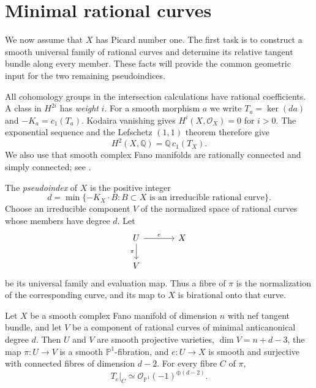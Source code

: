 \section{Minimal rational curves}\label{sec:minimal-curves}

We now assume that $X$ has Picard number one.  The first task is to
construct a smooth universal family of rational curves and determine its
relative tangent bundle along every member.  These facts will provide the
common geometric input for the two remaining pseudoindices.

All cohomology groups in the intersection calculations have rational
coefficients.  A class in $H^{2i}$ has \emph{weight} $i$.  For a smooth
morphism $a$ we write $T_a=\ker(da)$ and $-K_a=c_1(T_a)$.
Kodaira vanishing gives $H^i(X,\mathcal O_X)=0$ for $i>0$.
The exponential sequence and the Lefschetz $(1,1)$ theorem therefore give
\begin{equation}\label{eq:picard-cohomology}
  H^2(X,\mathbb Q)=\mathbb Q\,c_1(T_X).
\end{equation}
We also use that smooth complex Fano manifolds are rationally connected
and simply connected; see
\cite[Theorems~2.11 and~5.3.2]{CampanaPeternell1999}.

The \emph{pseudoindex} of $X$ is the positive integer
\[
 d=\min\{-K_X\cdot B:B\subset X\text{ is an irreducible rational curve}\}.
\]
Choose an irreducible component $V$ of the normalized space of rational
curves whose members have degree $d$.  Let
\begin{equation}\label{eq:universal-family}
 \begin{tikzcd}[column sep=large]
 U \arrow[r,"e"] \arrow[d,"\pi"'] & X\\
 V &
 \end{tikzcd}
\end{equation}
be its universal family and evaluation map.  Thus a fibre of $\pi$ is the
normalization of the corresponding curve, and its map to $X$ is
birational onto that curve.

\begin{proposition}\label{prop:minimal-family}
Let $X$ be a smooth complex Fano manifold of dimension $n$ with nef tangent
bundle, and let $V$ be a component of rational curves of minimal
anticanonical degree $d$.  Then $U$ and $V$ are smooth projective varieties,
$\dim V=n+d-3$, the map $\pi:U\to V$ is a smooth $\mathbb P^1$-fibration,
and $e:U\to X$ is smooth and surjective with connected fibres of dimension
$d-2$.  For every fibre $C$ of $\pi$,
\begin{equation}\label{eq:relative-tangent-splitting}
 T_e|_C\simeq\mathcal O_{\mathbb P^1}(-1)^{\oplus(d-2)}.
\end{equation}
\end{proposition}


